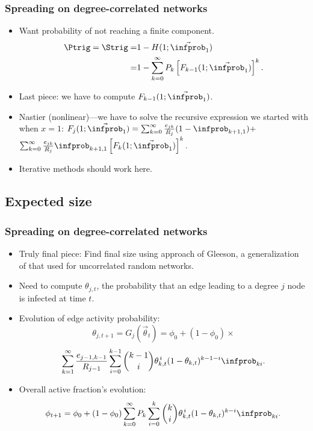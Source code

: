 \begin{frame}
  \frametitle{Spreading on degree-correlated networks}


  \begin{itemize}
  \item<1-> 
    Want probability of \alert{not reaching} a finite component.
    \begin{align}
      \nonumber
      \Ptrig  = \Strig 
      = & 
      1 -
      H(1;\vec{\infprob}_1) 
      \\
      \nonumber
      = &
      1
      -
      \sum_{k=0}^\infty
      P_k
      \left[
        F_{k-1}(1;\vec{\infprob}_1)
      \right]^k.
    \end{align}
  \item<2->
    Last piece: we have to compute $F_{k-1}(1;\vec{\infprob}_1)$.
  \item<3->
    Nastier (nonlinear)---we have to solve the 
    recursive expression we started with when $x=1$:
    $
      F_j(1;\vec{\infprob}_1)
      =
      \sum_{k=0}^{\infty} 
      \frac{e_{jk}}{R_j}
      ( 1 - \infprob_{k+1,1} )
      + $\\
      \mbox{} \hfill
      $
      \sum_{k=0}^{\infty} 
      \frac{e_{jk}}{R_j}
      \infprob_{k+1,1}
      \left[
        F_k(1;\vec{\infprob}_1)
      \right]^k.
    $
  \item<4->
    Iterative methods should work here.
  \end{itemize}

\end{frame}

\subsection{Expected size}

\begin{frame}
  \frametitle{Spreading on degree-correlated networks}

  \begin{itemize}
  \item<1->
    \alert{Truly final piece:} 
    Find final size using approach of Gleeson\cite{gleeson2008a},
    a generalization of that used for uncorrelated random networks.
  \item<2->
    Need to compute $\theta_{j,t}$, the probability that 
    an edge leading to a degree $j$ node is infected at time $t$.
  \item<3->
    Evolution of edge activity probability:
    $$
    \theta_{j,t+1}
    =
    G_j(\vec{\theta}_t)
    =
    \phi_0 + 
    (1-\phi_0) \times
    $$
    $$
    \sum_{k=1}^{\infty}
    \frac{e_{j-1,k-1}}{R_{j-1}}
    \sum_{i=0}^{k-1}
    \binom{k-1}{i}
    \theta_{k,t}^{\, i}
    (1-\theta_{k,t})^{k-1-i}
    \infprob_{ki}.
    $$
  \item<4-> 
    Overall active fraction's evolution:
    $$
    \phi_{t+1}
    =
    \phi_0
    +
    (1-\phi_0)
    \sum_{k=0}^{\infty}
    P_k
    \sum_{i=0}^{k}
    \binom{k}{i}
    \theta_{k,t}^{\, i}
    (1-\theta_{k,t})^{k-i}
    \infprob_{ki}.
    $$
  \end{itemize}

\end{frame}

